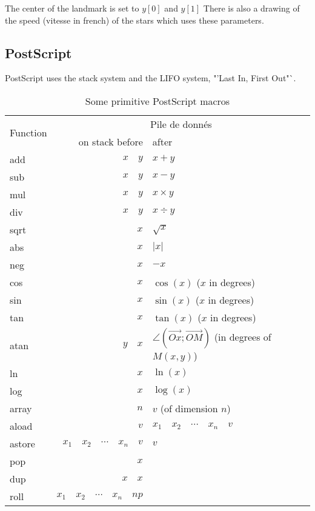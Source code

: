 The center of the landmark is set to $y[0]$ and $y[1]$
There is also a drawing of the speed (vitesse in french) of the stars which uses
these parameters.

\iffalse

\subsection{PostScript}

PostScript uses the stack system and the LIFO system, "'Last In, First Out"`.

\newlength{\Li}\settowidth{\Li}{Function}
\begin{table}[htbp]
  \begin{center}{\ttfamily
    \begin{tabular}{|l|r@{ $\rightarrow$ }l|}\hline
    \multirow{2}{\Li}{\normalfont Function}&\multicolumn{2}{c|}{\normalfont Pile de donnés}\\
    &\normalfont on stack before & \normalfont after\\\hline\hline
    add&$x\quad y$&$x+y$\\\hline
    sub&$x\quad y$&$x-y$\\\hline
    mul&$x\quad y$&$x\times y$\\\hline
    div&$x\quad y$&$x\div y$\\\hline
    sqrt&$x$&$\sqrt{x}$\\\hline
    abs&$x$&$|x|$\\\hline
    neg&$x$&$-x$\\\hline
    cos&$x$&$\cos(x)$ ($x$ in degrees)\\\hline
    sin&$x$&$\sin(x)$ ($x$  in degrees)\\\hline
    tan&$x$&$\tan(x)$ ($x$  in degrees)\\\hline
    atan&$y\quad x$&$\angle{(\vec{Ox};\vec{OM})}$ (in degrees of $M(x,y)$)\\\hline
    ln&$x$&$\ln(x)$\\\hline
    log&$x$&$\log(x)$\\\hline
    array&$n$&\normalfont$v$ (of dimension $n$)\\\hline
    aload&$v$&$x_1\quad x_2\quad \cdots\quad x_n\quad v$\\\hline
    astore&$x_1\quad x_2\quad \cdots\quad x_n\quad v$&$v$\\\hline
    pop&$x$&\\\hline
    dup&$x\quad x$&\\\hline
    roll&$x_1\quad x_2\quad \cdots\quad x_n\quad n p$&\\\hline
  \end{tabular}}
    \caption{Some primitive PostScript macros}\label{tab:primpost}
  \end{center}
\end{table}

